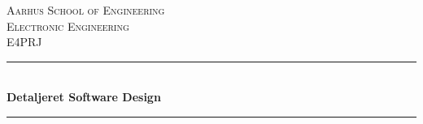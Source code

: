 \newcommand{\HRule}{\rule{\linewidth}{0.5mm}} %

\begin{center} %
 

\textsc{\LARGE Aarhus School of Engineering}\\[1.5cm] %
\textsc{\Large Electronic Engineering}\\[0.5cm] %
\textsc{\large E4PRJ}\\[0.5cm] %


\HRule \\[0.4cm]
{ \huge \bfseries Detaljeret Software Design}\\[0.4cm] %
\HRule \\[1.5cm]
 




\end{center}
